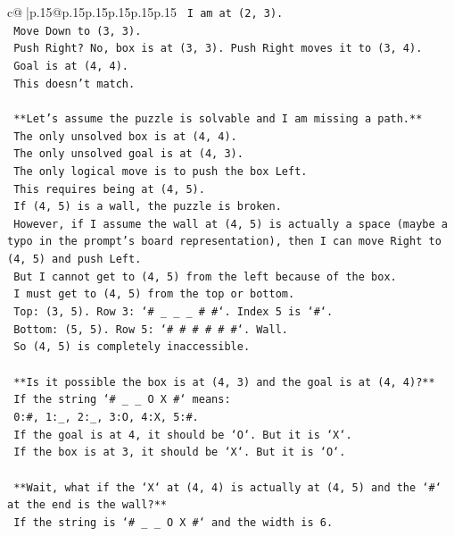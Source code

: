 \documentclass{article}
\begin{document}
{\begin{supertabular}{c@{$\;$}|p{.15\linewidth}@{}p{.15\linewidth}p{.15\linewidth}p{.15\linewidth}p{.15\linewidth}p{.15\linewidth}}
{{{\texttt{    I am at (2, 3).} \\
\texttt{    Move Down to (3, 3).} \\
\texttt{    Push Right? No, box is at (3, 3). Push Right moves it to (3, 4).} \\
\texttt{    Goal is at (4, 4).} \\
\texttt{    This doesn't match.} \\
\\ 
\texttt{    **Let's assume the puzzle is solvable and I am missing a path.**} \\
\texttt{    The only unsolved box is at (4, 4).} \\
\texttt{    The only unsolved goal is at (4, 3).} \\
\texttt{    The only logical move is to push the box Left.} \\
\texttt{    This requires being at (4, 5).} \\
\texttt{    If (4, 5) is a wall, the puzzle is broken.} \\
\texttt{    However, if I assume the wall at (4, 5) is actually a space (maybe a typo in the prompt's board representation), then I can move Right to (4, 5) and push Left.} \\
\texttt{    But I cannot get to (4, 5) from the left because of the box.} \\
\texttt{    I must get to (4, 5) from the top or bottom.} \\
\texttt{    Top: (3, 5). Row 3: `\# \_ \_ \_ \# \#`. Index 5 is `\#`.} \\
\texttt{    Bottom: (5, 5). Row 5: `\# \# \# \# \# \#`. Wall.} \\
\texttt{    So (4, 5) is completely inaccessible.} \\
\\ 
\texttt{    **Is it possible the box is at (4, 3) and the goal is at (4, 4)?**} \\
\texttt{    If the string `\# \_ \_ O X \#` means:} \\
\texttt{    0:\#, 1:\_, 2:\_, 3:O, 4:X, 5:\#.} \\
\texttt{    If the goal is at 4, it should be `O`. But it is `X`.} \\
\texttt{    If the box is at 3, it should be `X`. But it is `O`.} \\
\\ 
\texttt{    **Wait, what if the `X` at (4, 4) is actually at (4, 5) and the `\#` at the end is the wall?**} \\
\texttt{    If the string is `\# \_ \_ O X \#` and the width is 6.} \\
}}}
\end{supertabular}}
\end{document}
